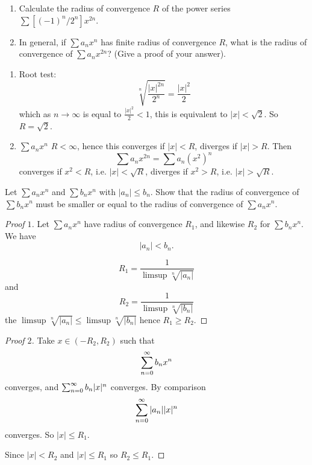 \documentclass[10pt, a4paper]{article}
\begin{document}
\begin{problem}[$1$]
    \begin{enumerate}[label = (\roman*)]
        \item Calculate the radius of convergence $R$ of the power series $\sum[(-1) ^ n /  2 ^ n]x ^ {2n}$.

        \item In general,
        if $\sum a_nx ^ n$ has finite radius of convergence $R$,
        what is the radius of convergence of $\sum a_nx ^ {2n}$?
        (Give a proof of your answer).
    \end{enumerate}

    \begin{solution}
        \begin{enumerate}[label = (\roman*)]
            \item Root test:
            \[
            \sqrt[n]{\frac{|x| ^ {2n}}{2 ^ n}} = \frac{|x| ^ 2}{2}
            \]
            which as $n \rightarrow \infty$ is equal to $\frac{|x| ^ 2}{2} < 1$,
            this is equivalent to $|x| < \sqrt{2}$.
            So $R = \sqrt{2}$.

            \item
            $\sum a_nx ^ n$ $R < \infty$,
            hence this converges if $|x| < R$,
            diverges if $|x| > R$.
            Then
            \[
            \sum a_nx ^ {2n} = \sum a_n(x ^ 2) ^ n
            \]
            converges if $x ^ 2 < R$,
            i.e. $|x| < \sqrt{R}$,
            diverges if $x ^ 2 > R$,
            i.e. $|x| > \sqrt{R}$.
        \end{enumerate}
    \end{solution}
\end{problem}

\begin{problem}[5]
    Let $\sum a_nx ^ n$ and $\sum b_nx ^ n$ with $|a_n| \leq b_n$.
    Show that the radius of convergence of $\sum b_nx ^ n$ must be smaller or equal to the radius of convergence of $\sum a_nx ^ n$.

    \begin{proof}[Proof $1$]
        Let $\sum a_nx ^ n$ have radius of convergence $R_1$,
        and likewise $R_2$ for $\sum b_nx ^ n$.
        We have
        \[
        |a_n| < b_n.
        \]

        \[
        R_1 = \frac{1}{\limsup\sqrt[n]{|a_n|}}
        \]
        and
        \[
        R_2 = \frac{1}{\limsup\sqrt[n]{|b_n|}}
        \]
        the $\limsup{\sqrt[n]{|a_n|}} \leq \limsup{\sqrt[n]{|b_n|}}$ hence $R_1 \geq R_2$. 
    \end{proof}

    \begin{proof}[Proof $2$]
        Take $x \in (-R_2, R_2)$ such that
        \[
        \infsum[n = 0]b_nx ^ n
        \]
        converges,
        and $\infsum[n = 0]b_n|x| ^ n$ converges.
        By comparison
        \[
        \infsum[n = 0]|a_n||x| ^ n
        \]
        converges.
        So $|x| \leq R_1$.

       Since $|x| < R_2$ and $|x| \leq R_1$ so $R_2 \leq R_1$.
    \end{proof}
\end{problem}
\end{document}
